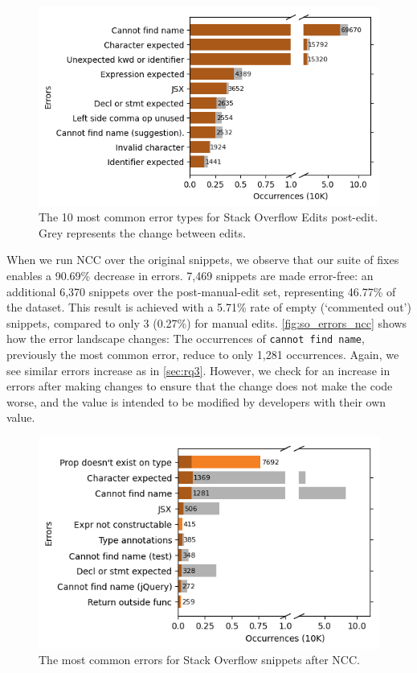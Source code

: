 \documentclass[conference]{IEEEtran}
\begin{document}
\begin{figure}[h]
    \centering
    \includegraphics[width=0.8\linewidth]{images/soif_errorTypes.png}
    \caption{The 10 most common error types for Stack Overflow Edits post-edit. Grey represents the change between edits.}
    \label{fig:so_errors_post}
\end{figure}

When we run NCC over the original snippets, we observe that our suite of fixes enables a 90.69\% decrease in errors. 7,469 snippets are made error-free: an additional 6,370 snippets over the post-manual-edit set, representing 46.77\% of the dataset. This result is achieved with a 5.71\% rate of empty (`commented out') snippets, compared to only 3 (0.27\%) for manual edits. \autoref{fig:so_errors_ncc} shows how the error landscape changes: The occurrences of \texttt{cannot find name}, previously the most common error, reduce to only 1,281 occurrences. Again, we see similar errors increase as in \autoref{sec:rq3}. However, we check for an increase in errors after making changes to ensure that the change does not make the code worse, and the value is intended to be modified by developers with their own value.

\begin{figure}[h]
    \centering
    \includegraphics[width=0.8\linewidth]{images/soi_af_errorTypes.png}
    \caption{The most common errors for Stack Overflow snippets after NCC.}
    \label{fig:so_errors_ncc}
\end{figure}
\end{document}

